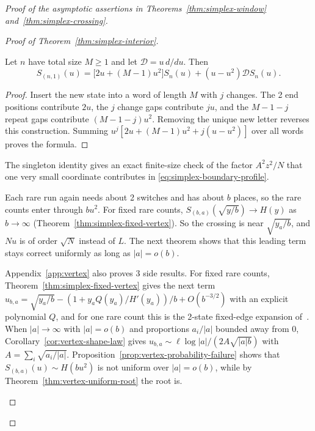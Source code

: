 \begin{proof}[Proof of the asymptotic assertions in
Theorems~\ref{thm:simplex-window} and~\ref{thm:simplex-crossing}]
\begin{proof}[Proof of Theorem~\ref{thm:simplex-interior}]
\begin{lemma}
\label{lem:singleton-insertion}
Let $n$ have total size $M\ge1$ and let $\mathcal D=u\,d/du$. Then
\[
S_{(n,1)}(u)=\bigl[2u+(M-1)u^2\bigr]S_n(u)
+(u-u^2)\mathcal D S_n(u).
\]
\end{lemma}

\begin{proof}
Insert the new state into a word of length $M$ with $j$ changes. The 2 end
positions contribute $2u$, the $j$ change gaps contribute $ju$, and the
$M-1-j$ repeat gaps contribute $(M-1-j)u^2$. Removing the unique new letter
reverses this construction. Summing
$u^j[2u+(M-1)u^2+j(u-u^2)]$ over all words proves the formula.
\end{proof}

The singleton identity gives an exact finite-size check of the factor
$A^2z^2/N$ that one very small coordinate contributes in
\eqref{eq:simplex-boundary-profile}.

Each rare run again needs about 2 switches and has about $b$ places, so the
rare counts enter through $bu^2$. For fixed rare counts,
$S_{(b,a)}(\sqrt{y/b})\to H(y)$ as $b\to\infty$
(Theorem~\ref{thm:simplex-fixed-vertex}). So the crossing is near
$\sqrt{y_a/b}$, and $Nu$ is of order $\sqrt N$ instead of $L$. The next
theorem shows that this leading term stays correct uniformly as long as
$|a|=o(b)$.


\begin{remark}
Appendix~\ref{app:vertex} also proves 3 side results. For fixed rare counts,
Theorem~\ref{thm:simplex-fixed-vertex} gives the next term
$u_{b,a}=\sqrt{y_a/b}-(1+y_aQ(y_a)/H'(y_a))/b+O(b^{-3/2})$ with an explicit
polynomial $Q$, and for one rare count this is the 2-state fixed-edge
expansion of~\cite{paperA}. When $|a|\to\infty$ with $|a|=o(b)$ and
proportions $a_i/|a|$ bounded away from $0$,
Corollary~\ref{cor:vertex-shape-law} gives
$u_{b,a}\sim\ell\log|a|/(2A\sqrt{|a|b})$ with $A=\sum_i\sqrt{a_i/|a|}$.
Proposition~\ref{prop:vertex-probability-failure} shows that
$S_{(b,a)}(u)\sim H(bu^2)$ is not uniform over $|a|=o(b)$, while by
Theorem~\ref{thm:vertex-uniform-root} the root is.
\end{remark}



\end{proof}
\end{proof}
